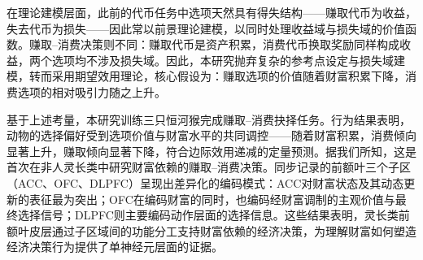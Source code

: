 在理论建模层面，此前的代币任务中选项天然具有得失结构——赚取代币为收益，失去代币为损失——因此常以前景理论建模，以同时处理收益域与损失域的价值函数。赚取–消费决策则不同：赚取代币是资产积累，消费代币换取奖励同样构成收益，两个选项均不涉及损失域。因此，本研究抛弃复杂的参考点设定与损失域建模，转而采用期望效用理论，核心假设为：赚取选项的价值随着财富积累下降，消费选项的相对吸引力随之上升。

基于上述考量，本研究训练三只恒河猴完成赚取–消费抉择任务。行为结果表明，动物的选择偏好受到选项价值与财富水平的共同调控——随着财富积累，消费倾向显著上升，赚取倾向显著下降，符合边际效用递减的定量预测。据我们所知，这是首次在非人灵长类中研究财富依赖的赚取–消费决策。同步记录的前额叶三个子区（ACC、OFC、DLPFC）呈现出差异化的编码模式：ACC对财富状态及其动态更新的表征最为突出；OFC在编码财富的同时，也编码经财富调制的主观价值与最终选择信号；DLPFC则主要编码动作层面的选择信息。这些结果表明，灵长类前额叶皮层通过子区域间的功能分工支持财富依赖的经济决策，为理解财富如何塑造经济决策行为提供了单神经元层面的证据。